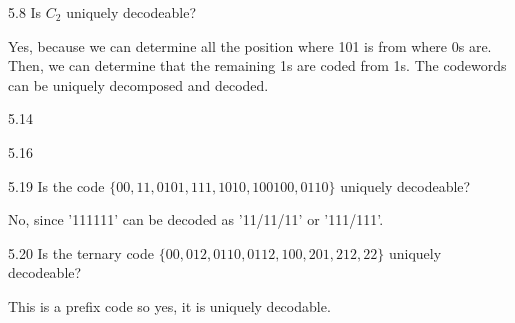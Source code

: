 \documentclass[12pt, a4paper]{article}
\begin{document}
\begin{prob}{5.8}
Is $C_2$ uniquely decodeable?
\end{prob}
\begin{sol}
Yes, because we can determine all the position where 101 is from where 0s are. Then, we can determine that the remaining 1s are coded from 1s.
The codewords can be uniquely decomposed and decoded.
\end{sol}
\bigskip


\begin{prob}{5.14}
\end{prob}
\begin{sol}
\end{sol}
\bigskip


\begin{prob}{5.16}
\end{prob}
\begin{sol}
\end{sol}
\bigskip


\begin{prob}{5.19}
Is the code $\{00, 11, 0101, 111, 1010, 100100, 0110\}$ uniquely decodeable?
\end{prob}
\begin{sol}
No, since '111111' can be decoded as '11/11/11' or '111/111'.
\end{sol}
\bigskip


\begin{prob}{5.20}
Is the ternary code $\{00, 012, 0110, 0112, 100, 201, 212, 22\}$ uniquely decodeable?
\end{prob}
\begin{sol}
This is a prefix code so yes, it is uniquely decodable.
\end{sol}
\bigskip

\begin{prob}{}
\end{prob}
\begin{sol}
\end{sol}
\bigskip
\end{document}
